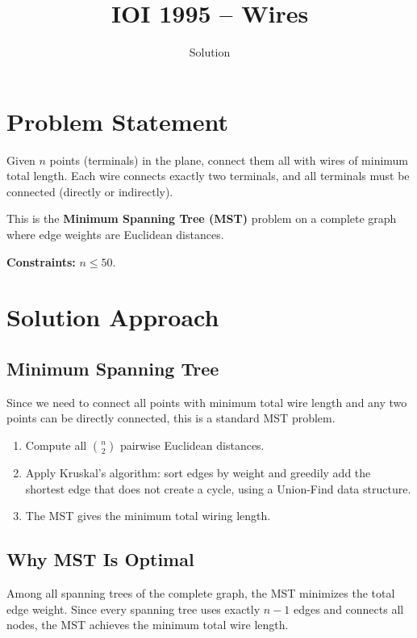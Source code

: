 \documentclass[11pt,a4paper]{article}
\title{IOI 1995 -- Wires}
\author{Solution}
\date{}
\begin{document}
\maketitle

\section{Problem Statement}

Given $n$ points (terminals) in the plane, connect them all with wires of minimum total
length. Each wire connects exactly two terminals, and all terminals must be connected
(directly or indirectly).

This is the \textbf{Minimum Spanning Tree (MST)} problem on a complete graph where
edge weights are Euclidean distances.

\medskip
\noindent\textbf{Constraints:} $n \le 50$.

\section{Solution Approach}

\subsection{Minimum Spanning Tree}

Since we need to connect all points with minimum total wire length and any two points
can be directly connected, this is a standard MST problem.

\begin{enumerate}
  \item Compute all $\binom{n}{2}$ pairwise Euclidean distances.
  \item Apply Kruskal's algorithm: sort edges by weight and greedily add the shortest
        edge that does not create a cycle, using a Union-Find data structure.
  \item The MST gives the minimum total wiring length.
\end{enumerate}

\subsection{Why MST Is Optimal}

Among all spanning trees of the complete graph, the MST minimizes the total edge weight.
Since every spanning tree uses exactly $n-1$ edges and connects all nodes, the MST
achieves the minimum total wire length.
\end{document}
